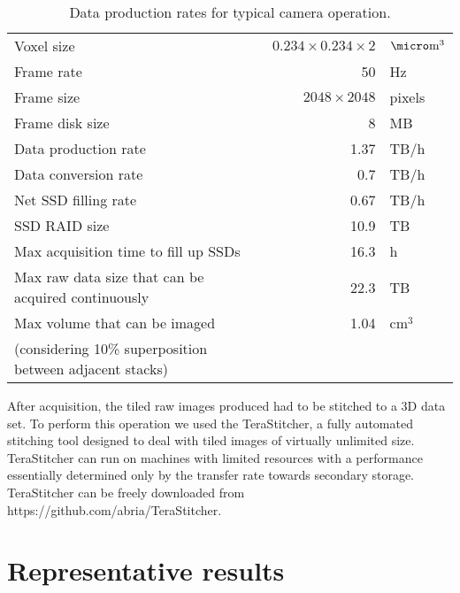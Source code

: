 \documentclass[12pt]{spieman}  %
\begin{document}
\begin{spacing}{2}
\begin{table}%
	\centering
		\caption[Data production]{Data production rates for typical camera operation.\label{tab:dataproduction}}
		\begin{tabular}{lrl}
		\\
		Voxel size																								& $0.234 \times 0.234 \times 2$	& $\micro\text{m}^3$ 	\\
		Frame rate																								& 50														& Hz								\\
		Frame size																								& $2048 \times 2048$ 						& pixels						\\
		Frame disk size																						& 8									 						& MB								\\
		Data production rate																			& 1.37							 						& TB/h 							\\
		Data conversion rate																			& 0.7								 						& TB/h 							\\
		Net SSD filling rate																			& 0.67							 						& TB/h 							\\
		SSD RAID size																							& 10.9							 						& TB								\\
		Max acquisition time to fill up SSDs											& 16.3							 						& h									\\
		Max raw data size that can be acquired continuously				& 22.3							 						& TB								\\
		Max volume that can be imaged 														& 1.04							 						& $\text{cm}^3$ 		\\
		(considering 10\% superposition between adjacent stacks)	&										 						&										\\
		\end{tabular}
\end{table}

After acquisition, the tiled raw images produced had to be stitched to a 3D data set. To perform this operation we used the TeraStitcher\cite{Bria2012}, a fully automated stitching tool designed to deal with tiled images of virtually unlimited size. TeraStitcher can run on machines with limited resources with a performance essentially determined only by the transfer rate towards secondary storage. TeraStitcher can be freely downloaded from https://github.com/abria/TeraStitcher.

\section{Representative results}


\end{spacing}
\end{document}
